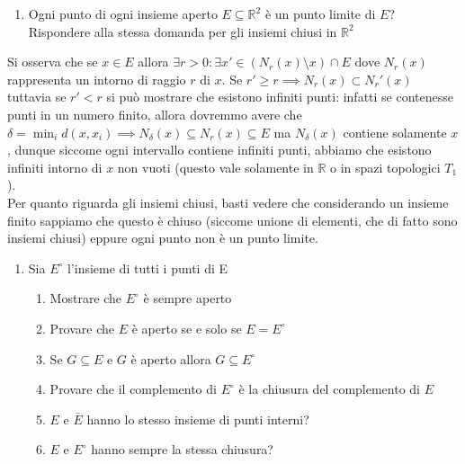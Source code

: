\documentclass{report}
\begin{document}
\begin{enumerate}[resume, label=\protect\circled{\arabic*}]
	\item Ogni punto di ogni insieme aperto $E \subseteq \mathbb{R}^2$ è un punto limite di $E$? Rispondere alla stessa domanda per gli insiemi chiusi in $\mathbb{R}^2$
\end{enumerate}
\begin{mysolution}
	Si osserva che se $x \in E$ allora $\exists r > 0: \exists x' \in (N_r(x) \setminus x) \cap E$ dove $N_r(x)$ rappresenta un intorno di raggio $r$ di $x$. Se $r' \geq r \implies N_r(x) \subset N_r'(x)$ tuttavia se $r' < r$ si può mostrare che esistono infiniti punti: infatti se contenesse punti in un numero finito, allora dovremmo avere che $\delta = \min_{i}{d(x, x_i)} \implies N_{\delta}(x) \subseteq N_{r}(x) \subseteq E$ ma $N_{\delta}(x)$ contiene solamente $x$, dunque siccome ogni intervallo contiene infiniti punti, abbiamo che esistono infiniti intorno di $x$ non vuoti (questo vale solamente in $\mathbb{R}$ o in spazi topologici $T_1$). \\
	Per quanto riguarda gli insiemi chiusi, basti vedere che considerando un insieme finito sappiamo che questo è chiuso (siccome unione di elementi, che di fatto sono insiemi chiusi) eppure ogni punto non è un punto limite.
\end{mysolution}
\begin{enumerate}[resume, label=\protect\circled{\arabic*}]
	\item Sia $E^{\circ}$ l'insieme di tutti i punti di E
	\begin{enumerate}
		\item Mostrare che $E^{\circ}$ è sempre aperto
		\item Provare che $E$ è aperto se e solo se $E = E^{\circ}$
		\item Se $G \subseteq E$ e $G$ è aperto allora $G \subseteq E^{\circ}$
		\item Provare che il complemento di $E^{\circ}$ è la chiusura del complemento di $E$
		\item $E$ e $\bar{E}$ hanno lo stesso insieme di punti interni?
		\item $E$ e $E^{\circ}$ hanno sempre la stessa chiusura?
	\end{enumerate}
\end{enumerate}
\end{document}
